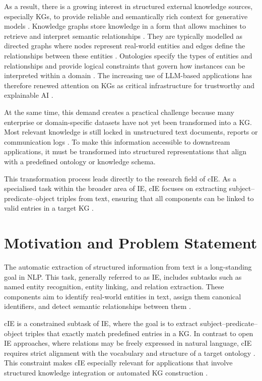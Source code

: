 \documentclass[a4paper,oneside,bibliography=totoc]{scrbook}
\begin{document}
As a result, there is a growing interest in structured external knowledge sources, especially \acp{KG}, to provide reliable and semantically rich context for generative models \cite{Korolov2025}. Knowledge graphs store knowledge in a form that allows machines to retrieve and interpret semantic relationships \cite{GomezPerez2017}. They are typically modelled as directed graphs where nodes represent real-world entities and edges define the relationships between these entities \cite{Paulheim2016}. Ontologies specify the types of entities and relationships and provide logical constraints that govern how instances can be interpreted within a domain \cite{GomezPerez2017,Paulheim2016}. The increasing use of \ac{LLM}-based applications has therefore renewed attention on \acp{KG} as critical infrastructure for trustworthy and explainable \ac{AI} \cite{Korolov2025}.

At the same time, this demand creates a practical challenge because many enterprise or domain-specific datasets have not yet been transformed into a \ac{KG}. Most relevant knowledge is still locked in unstructured text documents, reports or communication logs \cite{Korolov2025}. To make this information accessible to downstream applications, it must be transformed into structured representations that align with a predefined ontology or knowledge schema.

This transformation process leads directly to the research field of \ac{cIE}. As a specialised task within the broader area of \ac{IE}, \ac{cIE} focuses on extracting subject–predicate–object triples from text, ensuring that all components can be linked to valid entries in a target \ac{KG} \cite{Josifoski2021}.

\section{Motivation and Problem Statement}
\label{sec:motivation}

The automatic extraction of structured information from text is a long-standing goal in \ac{NLP}. This task, generally referred to as \ac{IE}, includes subtasks such as named entity recognition, entity linking, and relation extraction. These components aim to identify real-world entities in text, assign them canonical identifiers, and detect semantic relationships between them \cite{Zhao2024}.

\Ac{cIE} is a constrained subtask of \ac{IE}, where the goal is to extract subject--predicate--object triples that exactly match predefined entries in a \ac{KG}. In contrast to open \ac{IE} approaches, where relations may be freely expressed in natural language, \ac{cIE} requires strict alignment with the vocabulary and structure of a target ontology \cite{Josifoski2021}. This constraint makes \ac{cIE} especially relevant for applications that involve structured knowledge integration or automated \ac{KG} construction \cite{Josifoski2021}.
\end{document}
